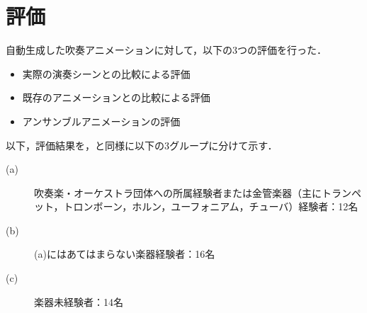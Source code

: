 \section{評価} \label{sec:review}
自動生成した吹奏アニメーションに対して，以下の3つの評価を行った．
\begin{itemize}
	\item 実際の演奏シーンとの比較による評価
	\item 既存のアニメーションとの比較による評価
	\item アンサンブルアニメーションの評価
\end{itemize}
以下，評価結果を，と同様に以下の3グループに分けて示す．
\begin{description}
	\item[(a)] 吹奏楽・オーケストラ団体への所属経験者または金管楽器（主にトランペット，トロンボーン，ホルン，ユーフォニアム，チューバ）経験者：12名
	\item[(b)] (a)にはあてはまらない楽器経験者：16名
	\item[(c)] 楽器未経験者：14名
\end{description}
\newpage
